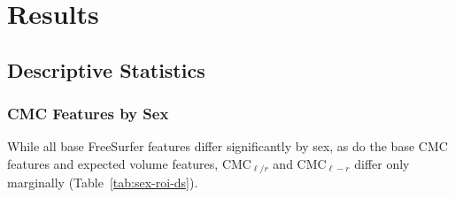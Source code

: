\documentclass{article}
\newcommand{\CMC}{\(\text{CMC}\) }
\begin{document}
\section{Results}



%



\subsection{Descriptive Statistics}





\subsubsection{CMC Features by Sex}

While all base FreeSurfer features differ significantly by sex, as do the
base \CMC features and expected volume features, \(\text{CMC}_{\ell/r}\) and
\(\text{CMC}_{\ell - r}\) differ only marginally (Table~\ref{tab:sex-roi-ds}).
\end{document}

